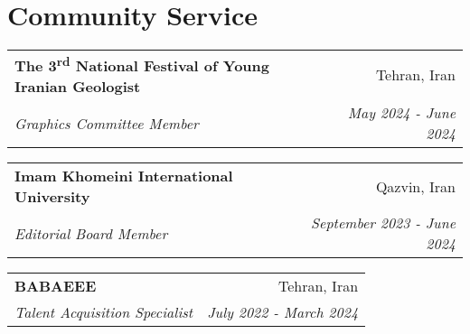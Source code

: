 \documentclass[letterpaper,11pt]{article}
\makeatletter
\newcommand{\ressubheading}[4]{
	\begin{tabular*}{6.5in}{l@{\cftdotfill{\cftsecdotsep}\extracolsep{\fill}}r}
		\textbf{#1} & #2 \\
		\textit{#3} & \textit{#4} \\
	\end{tabular*}\vspace{-8pt}
}
\makeatother
\begin{document}
\section{Community Service}
\ressubheading{The 3\textsuperscript{rd} National Festival of Young Iranian Geologist}{Tehran, Iran}{Graphics Committee Member}{May 2024 - June 2024}

\vspace{0.99em} 

\ressubheading{Imam Khomeini International University}{Qazvin, Iran}{Editorial Board Member}{September 2023 - June 2024}

\vspace{0.99em} 

\ressubheading{BABAEEE}{Tehran, Iran}{Talent Acquisition Specialist}{July 2022 - March 2024}

\end{document}
